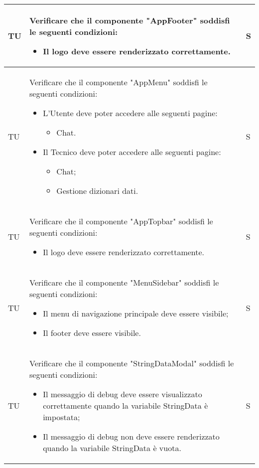 \begin{adjustwidth}{-0.5cm}{-0.5cm}
\begin{longtable}{|P{1.5cm}|>{\raggedright}P{9.5cm}|>{\arraybackslash}P{1.5cm}|}
		\hline TU & Verificare che il componente "AppFooter" soddisfi le seguenti condizioni:
    \begin{itemize}
      \item Il logo deve essere renderizzato correttamente.
    \end{itemize} & S \\
    \hline TU & Verificare che il componente "AppMenu" soddisfi le seguenti condizioni:
    \begin{itemize}
      \item L'Utente deve poter accedere alle seguenti pagine:
      \begin{itemize}
        \item Chat.
      \end{itemize}
      \item Il Tecnico deve poter accedere alle seguenti pagine:
      \begin{itemize}
        \item Chat;
        \item Gestione dizionari dati.
      \end{itemize}
    \end{itemize} & S \\
    \hline TU & Verificare che il componente "AppTopbar" soddisfi le seguenti condizioni:
    \begin{itemize}
      \item Il logo deve essere renderizzato correttamente.
    \end{itemize} & S \\
    \hline TU & Verificare che il componente "MenuSidebar" soddisfi le seguenti condizioni:
    \begin{itemize}
      \item Il menu di navigazione principale deve essere visibile;
      \item Il footer deve essere visibile.
    \end{itemize} & S \\
    \hline TU & Verificare che il componente "StringDataModal" soddisfi le seguenti condizioni:
    \begin{itemize}
      \item Il messaggio di debug deve essere visualizzato correttamente quando la variabile StringData è impostata;
      \item Il messaggio di debug non deve essere renderizzato quando la variabile StringData è vuota.
    \end{itemize} & S \\
	\end{longtable}
\end{adjustwidth}
\egroup